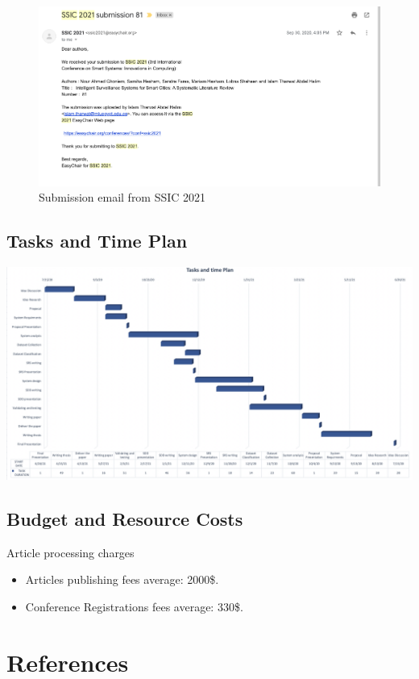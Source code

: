 \documentclass[12pt]{article}
\begin{document}
 \FloatBarrier
    \begin{figure}[htp]
    \includegraphics[width=15cm]{7.png}
    \caption{Submission email from SSIC 2021}

\end{figure}
\subsection{Tasks and Time Plan}

\includegraphics[width=1\textwidth]{./20.jpg}
\newline
\subsection{Budget and Resource Costs}
Article processing charges
\begin{itemize}
\item Articles publishing fees average: 2000\$.
\item Conference Registrations fees average: 330\$.
\end{itemize}

\section {References}
\nocite{*}
\printbibliography
\end{document}

